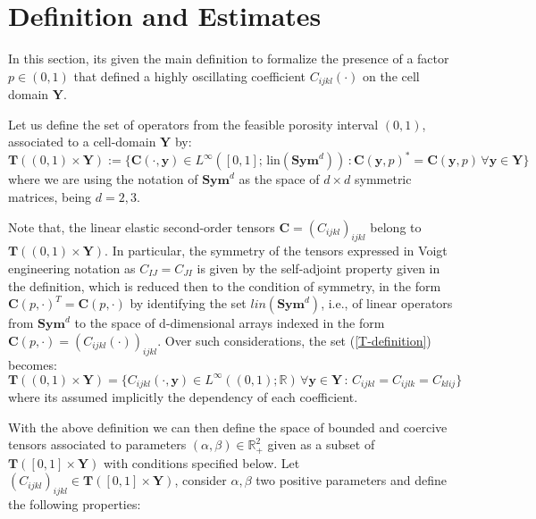 \section{Definition and Estimates}
In this section, its given the main definition to formalize the presence of a factor $p \in (0,1)$ that defined a highly oscillating coefficient $C_{ijkl}(\cdot)$ on the cell domain $\mathbf{Y}$.
\begin{defn}
Let us define the set of operators from the feasible porosity interval $(0,1)$, associated to a cell-domain $\mathbf{Y}$ by:
\begin{equation}
    \label{T-definition}
    \mathbf{T}((0,1) \times \mathbf{Y}) := \big \{ \mathbf{C}(\cdot, \mathbf{y}) \in L^{\infty}([0,1]; \, \text{lin}(\textbf{Sym}^d))\, : \mathbf{C}(\mathbf{y}, p)^* = \mathbf{C}(\mathbf{y}, p) \, \forall \mathbf{y} \in \mathbf{Y}\big \}
\end{equation}
where we are using the notation of $\mathbf{Sym}^d$ as the space of $d\times d$ symmetric matrices, being $d=2,3$.
\end{defn}
\begin{rem}
Note that, the linear elastic second-order tensors $\mathbf{C} = (C_{ijkl})_{ijkl}$ belong to $\mathbf{T}((0,1)\times \mathbf{Y})$. In particular, the symmetry of the tensors expressed in Voigt engineering notation as $C_{IJ}=C_{JI}$ is given by the self-adjoint property given in the definition, which is reduced then to the condition of symmetry, in the form $\mathbf{C}(p, \cdot)^T = \mathbf{C}(p,\cdot)$ by identifying the set $lin(\mathbf{Sym}^d)$, i.e., of linear operators from $\mathbf{Sym}^d$ to the space of d-dimensional arrays indexed in the form $\mathbf{C}(p, \cdot) = (C_{ijkl} (\cdot) )_{ijkl}$.
Over such considerations, the set (\ref{T-definition}) becomes:
\begin{equation*}
    \mathbf{T}((0,1)\times \mathbf{Y}) = \big \{ C_{ijkl}(\cdot, \mathbf{y}) \in L^{\infty}((0,1); \mathbb{R}) \, \forall \mathbf{y} \in \mathbf{Y}\,:\, C_{ijkl} = C_{ijlk} = C_{klij} \big \}
\end{equation*}
where its assumed implicitly the dependency of each coefficient.
\end{rem}
With the above definition we can then define the space of bounded and coercive tensors associated to parameters $(\alpha,\beta) \in \mathbb{R}^2_+$ given as a subset of $\mathbf{T}([0,1]\times \mathbf{Y})$ with conditions specified below.
Let $(C_{ijkl})_{ijkl} \in \mathbf{T}([0,1]\times \mathbf{Y})$, consider $\alpha, \beta$ two positive parameters and define the following properties:

